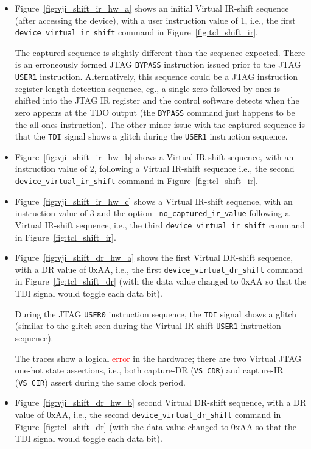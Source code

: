 \documentclass[10pt,twoside]{article}
\begin{document}
\begin{itemize}
\item Figure~\ref{fig:vji_shift_ir_hw_a} shows an initial Virtual IR-shift
sequence (after accessing the device), with a user instruction
value of 1, i.e., the first \verb+device_virtual_ir_shift+ command in
Figure~\ref{fig:tcl_shift_ir}.

The captured sequence is slightly different than the sequence expected.
There is an erroneously formed JTAG \verb+BYPASS+ instruction 
issued prior to the JTAG \verb+USER1+ instruction. Alternatively, this
sequence could be a JTAG instruction register length detection
sequence, eg., a single zero followed by ones is shifted into the
JTAG IR register and the control software detects when the
zero appears at the TDO output (the \verb+BYPASS+ command
just happens to be the all-ones instruction). The other minor 
issue with the captured sequence is that the \verb+TDI+
signal shows a glitch during the \verb+USER1+ instruction sequence.
%
\item Figure~\ref{fig:vji_shift_ir_hw_b} shows a Virtual IR-shift
sequence, with an instruction value of 2, following a Virtual IR-shift 
sequence i.e., the second \verb+device_virtual_ir_shift+ command in
Figure~\ref{fig:tcl_shift_ir}.
%
\item Figure~\ref{fig:vji_shift_ir_hw_c} shows a Virtual IR-shift 
sequence, with an instruction value of 3 and the option \newline
\verb+-no_captured_ir_value+
following a Virtual IR-shift sequence, i.e., the third\newline
\verb+device_virtual_ir_shift+ command in
Figure~\ref{fig:tcl_shift_ir}.
%
\item Figure~\ref{fig:vji_shift_dr_hw_a} shows the first Virtual 
DR-shift sequence, with a DR value of 0xAA, i.e., the first\newline
\verb+device_virtual_dr_shift+ command in
Figure~\ref{fig:tcl_shift_dr} (with the data value changed
to 0xAA so that the TDI signal would toggle each data bit).

During the JTAG \verb+USER0+ instruction sequence, the \verb+TDI+
signal shows a glitch (similar to the glitch seen during
the Virtual IR-shift \verb+USER1+ instruction sequence).

The traces show a logical \textcolor{red}{error} in the hardware;
there are two Virtual JTAG one-hot state assertions, i.e.,
both capture-DR (\verb+VS_CDR+) and capture-IR (\verb+VS_CIR+)
assert during the same clock period. 
%
\item Figure~\ref{fig:vji_shift_dr_hw_b} second Virtual DR-shift sequence,
with a DR value of 0xAA, i.e., the second
\verb+device_virtual_dr_shift+ command in
Figure~\ref{fig:tcl_shift_dr} (with the data value changed
to 0xAA so that the TDI signal would toggle each data bit).
\end{itemize}
\end{document}
